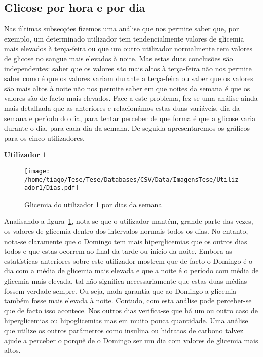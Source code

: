 \subsection{Glicose por hora e por dia}

Nas últimas subsecções fizemos uma análise que nos permite saber que, por exemplo, um determinado utilizador tem tendencialmente valores de glicemia mais elevados à terça-feira ou que um outro utilizador normalmente tem valores de glicose no sangue mais elevados à noite. Mas estas duas conclusões são independentes: saber que os valores são mais altos à terça-feira não nos permite saber como é que os valores variam durante a terça-feira ou saber que os valores são mais altos à noite não nos permite saber em que noites da semana é que os valores são de facto mais elevados. Face a este problema, fez-se uma análise ainda mais detalhada que as anteriores e relacionámos estas duas variáveis, dia da semana e período do dia, para tentar perceber de que forma é que a glicose varia durante o dia, para cada dia da semana. De seguida apresentaremos os gráficos para os cinco utilizadores. 

\textbf{Utilizador 1}

\begin{figure}[H]
\centering
\texttt{[image: /home/tiago/Tese/Tese/Databases/CSV/Data/ImagensTese/Utilizador1/Dias.pdf]}
\caption{Glicemia do utilizador 1 por dias da semana}
\label{fig:dias1}
\end{figure}
Analisando a figura~\ref{fig:dias1}, nota-se que o utilizador mantém, grande parte das vezes, os valores de glicemia dentro dos intervalos normais todos os dias. No entanto, nota-se claramente que o Domingo tem mais hiperglicemias que os outros dias todos e que estas ocorrem ao final da tarde ou início da noite. Embora as estatísticas anteriores sobre este utilizador mostrem que de facto o Domingo é o dia com a média de glicemia mais elevada e que a noite é o período com média de glicemia mais elevada, tal não significa necessariamente que estas duas médias fossem verdade sempre. Ou seja, nada garantia que ao Domingo a glicemia também fosse mais elevada à noite. Contudo, com esta análise pode perceber-se que de facto isso acontece. Nos outros dias verifica-se que há um ou outro caso de hiperglicemias ou hipoglicemias mas em muito pouca quantidade. Uma análise que utilize os outros parâmetros como insulina ou hidratos de carbono talvez ajude a perceber o porquê de o Domingo ser um dia com valores de glicemia mais altos. 

